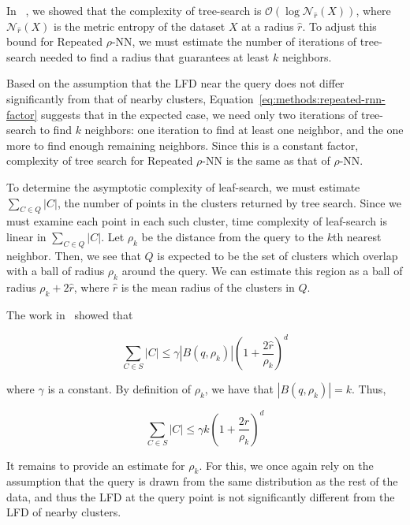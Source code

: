 In ~\cite{ishaq2019clustered}, we showed that the complexity of tree-search is $\mathcal{O}(\log\mathcal{N}_{\hat{r}}(X))$, where $\mathcal{N}_{\hat{r}}(X)$ is the metric entropy of the dataset $X$ at a radius $\hat{r}$.
To adjust this bound for Repeated $\rho$-NN, we must estimate the number of iterations of tree-search needed to find a radius that guarantees at least $k$ neighbors.

Based on the assumption that the LFD near the query does not differ significantly from that of nearby clusters, Equation~\ref{eq:methods:repeated-rnn-factor} suggests that in the expected case, we need only two iterations of tree-search to find $k$ neighbors:
one iteration to find at least one neighbor, and the one more to find enough remaining neighbors.
Since this is a constant factor, complexity of tree search for Repeated $\rho$-NN is the same as that of $\rho$-NN.

To determine the asymptotic complexity of leaf-search, we must estimate $\sum_{C \in Q} |C|$, the number of points in the clusters returned by tree search.
Since we must examine each point in each such cluster, time complexity of leaf-search is linear in $\sum_{C \in Q} |C|$. 
Let $\rho_k$ be the distance from the query to the $k$th nearest neighbor.
Then, we see that $Q$ is expected to be the set of clusters which overlap with a ball of radius $\rho_k$ around the query.
We can estimate this region as a ball of radius $\rho_k + 2\hat{r}$, where $\hat{r}$ is the mean radius of the clusters in $Q$.

The work in~\cite{yu2015entropy} showed that

\begin{equation*}
    \sum_{C \in S} |C| \leq \gamma  \left| B(q, \rho_k) \right| \left(1+ \frac{2\hat{r}}{\rho_k} \right)^d
\end{equation*}

where $\gamma$ is a constant. 
By definition of $\rho_k$, we have that $|B(q, \rho_k)| = k$.
Thus,

\begin{equation*}
    \sum_{C \in S} |C| \leq \gamma k \left( 1+ \frac{2\hat{r}}{\rho_k} \right)^d
\end{equation*}

It remains to provide an estimate for $\rho_k$. 
For this, we once again rely on the assumption that the query is drawn from the same distribution as the rest of the data, and thus the LFD at the query point is not significantly different from the LFD of nearby clusters.

